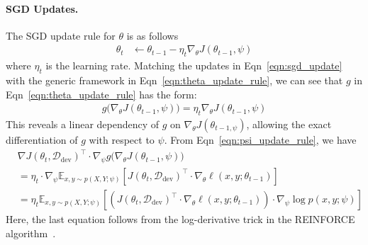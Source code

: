 \paragraph{SGD Updates.} The SGD update rule for $\theta$ is as follows
\begin{equation}
  \label{eqn:sgd_update}
  \begin{aligned}
    \theta_t &\leftarrow \theta_{t-1} - \eta_t \nabla_\theta J(\theta_{t-1}, \psi)
  \end{aligned}
\end{equation}
where $\eta_t$ is the learning rate. Matching the updates in Eqn~\ref{eqn:sgd_update} with the generic framework in Eqn~\ref{eqn:theta_update_rule}, we can see that $g$ in Eqn~\ref{eqn:theta_update_rule} has the form: %
\begin{equation}
  \label{eqn:momentum_update_g}
  \begin{aligned}
    g\big(\nabla_\theta J(\theta_{t-1}, \psi)\big) = \eta_t \nabla_\theta J(\theta_{t-1}, \psi)
  \end{aligned}
\end{equation}
This reveals a linear dependency of $g$ on $\nabla_\theta J(\theta_{t-1, \psi})$, allowing the exact differentiation of $g$ with respect to $\psi$. From Eqn~\ref{eqn:psi_update_rule}, we have
\begin{equation}
  \label{eqn:momentum_update_for_psi}
  \begin{aligned}
    &\nabla J(\theta_t, \mathcal{D}_\text{dev})^\top \cdot \nabla_\psi g\big( \nabla_\theta J(\theta_{t-1}, \psi) \big) \\
    &= \eta_t \cdot \nabla_\psi \mathbb{E}_{x, y \sim p(X, Y; \psi)} \left[J(\theta_t, \mathcal{D}_\text{dev})^\top \cdot \nabla_\theta \ell(x, y; \theta_{t-1} )\right] \\
    &= \eta_t \mathbb{E}_{x, y \sim p(X, Y; \psi)} \left[\left( J(\theta_t, \mathcal{D}_\text{dev})^\top \cdot \nabla_\theta \ell(x, y; \theta_{t-1} ) \right) \cdot \nabla_\psi \log{p(x, y; \psi)} \right]
  \end{aligned}
\end{equation}
Here, the last equation follows from the log-derivative trick in the REINFORCE algorithm~\citep{reinforce}. 

